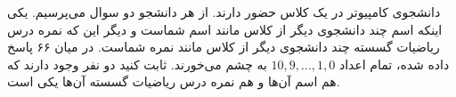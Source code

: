 \exercise
 دانشجوی کامپیوتر در یک کلاس حضور دارند. از هر دانشجو دو سوال می‌پرسیم. یکی اینکه اسم چند دانشجوی دیگر از کلاس مانند اسم شماست و دیگر این که نمره درس ریاضیات گسسته چند دانشجوی دیگر از کلاس مانند نمره شماست. در میان ۶۶ پاسخ داده شده، تمام اعداد $10,9,...,1,0$ به چشم می‌خورند. ثابت کنید دو نفر وجود دارند که هم اسم آن‌ها و هم نمره درس ریاضیات گسسته آن‌ها یکی است.